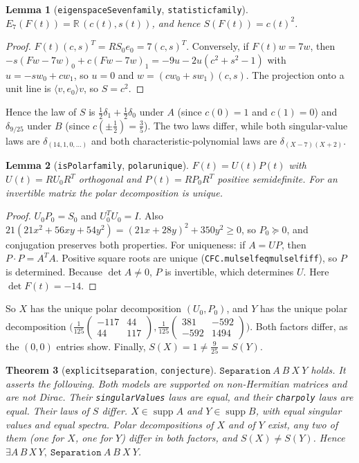 \documentclass[11pt]{article}
\newtheorem{theorem}{Theorem}
\newtheorem{lemma}[theorem]{Lemma}
\theoremstyle{definition}
\theoremstyle{remark}
\renewcommand{\_}{\oldus\allowbreak}
\begin{document}
\begin{lemma}[\texttt{eigenspaceSeven\_family}, \texttt{statistic\_family}]
$E_7(F(t))=\mathbb R\,(c(t),s(t))$, and hence $S(F(t))=c(t)^2$.
\end{lemma}
\begin{proof}
$F(t)(c,s)^T=R S_0 e_0=7(c,s)^T$. Conversely, if $F(t)w=7w$, then
$-s(F w-7w)_0+c(F w-7w)_1=-9u-2u(c^2+s^2-1)$ with $u=-sw_0+cw_1$, so $u=0$ and
$w=(cw_0+sw_1)(c,s)$. The projection onto a unit line is $\langle v,e_0\rangle v$, so $S=c^2$.
\end{proof}

Hence the law of $S$ is $\tfrac12\delta_1+\tfrac12\delta_0$ under $A$ (since $c(0)=1$ and $c(1)=0$) and
$\delta_{9/25}$ under $B$ (since $c(\pm\frac12)=\frac35$). The two laws differ, while both singular-value
laws are $\delta_{(14,1,0,\dots)}$ and both characteristic-polynomial laws are $\delta_{(X-7)(X+2)}$.

\begin{lemma}[\texttt{isPolar\_family}, \texttt{polar\_unique}]
$F(t)=U(t)P(t)$ with $U(t)=R U_0R^T$ orthogonal and $P(t)=RP_0R^T$ positive semidefinite. For an
invertible matrix the polar decomposition is unique.
\end{lemma}
\begin{proof}
$U_0P_0=S_0$ and $U_0^TU_0=I$. Also $21(21x^2+56xy+54y^2)=(21x+28y)^2+350y^2\ge0$, so $P_0\succeq0$, and
conjugation preserves both properties. For uniqueness: if $A=UP$, then $P\cdot P=A^TA$. Positive square
roots are unique (\texttt{CFC.mul\_self\_eq\_mul\_self\_iff}), so $P$ is determined. Because $\det A\ne0$,
$P$ is invertible, which determines $U$. Here $\det F(t)=-14$.
\end{proof}

So $X$ has the unique polar decomposition $(U_0,P_0)$, and $Y$ has the unique polar decomposition
$\bigl(\tfrac1{125}\begin{pmatrix}-117&44\\44&117\end{pmatrix},
\tfrac1{125}\begin{pmatrix}381&-592\\-592&1494\end{pmatrix}\bigr)$. Both factors differ, as the
$(0,0)$ entries show. Finally, $S(X)=1\ne\frac{9}{25}=S(Y)$.

\begin{theorem}[\texttt{explicit\_separation}, \texttt{conjecture\_5980}]
$\mathtt{Separation}\ A\ B\ X\ Y$ holds. It asserts the following. Both models are supported on
non-Hermitian matrices and are not Dirac. Their \texttt{singularValues} laws are equal, and their
\texttt{charpoly} laws are equal. Their laws of $S$ differ. $X\in\operatorname{supp}A$ and
$Y\in\operatorname{supp}B$, with equal singular values and equal spectra. Polar decompositions of $X$ and
of $Y$ exist, any two of them (one for $X$, one for $Y$) differ in both factors, and $S(X)\ne S(Y)$. Hence
$\exists A\,B\,X\,Y,\ \mathtt{Separation}\ A\ B\ X\ Y$.
\end{theorem}
\end{document}
